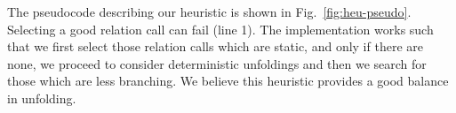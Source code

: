 The pseudocode describing our heuristic is shown in Fig.~\ref{fig:heu-pseudo}.
Selecting a good relation call can fail (line 1).
The implementation works such that we first select those relation calls which are static, and only if there are none, we proceed to consider deterministic unfoldings and then we search for those which are less branching.
We believe this heuristic provides a good balance in unfolding.



